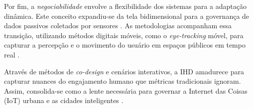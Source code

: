 \documentclass[
	12pt,				%
	oneside,			%
	a4paper,			%
	english,			%
	brazil				%
	]{abntex2ppgsi}
\begin{document}
    Por fim, a \emph{negociabilidade} envolve a flexibilidade dos sistemas para a adaptação dinâmica. Este conceito expandiu-se da tela bidimensional para a governança de dados passivos coletados por sensores \cite{Sailaja2024334, Lenzi2024, Mashhadi2014}. As metodologias acompanham essa transição, utilizando métodos digitais móveis, como o \textit{eye-tracking} móvel, para capturar a percepção e o movimento do usuário em espaços públicos em tempo real \cite{kaufmann2021ethical}.
    
    Através de métodos de \textit{co-design} e cenários interativos, a IHD amadurece para capturar nuances do engajamento humano que métricas tradicionais ignoram. Assim, consolida-se como a lente necessária para governar a Internet das Coisas (IoT) urbana e as cidades inteligentes \cite{sailaja2021exploring, DOWTHWAITE2024, DeBettio2023, Calvetti2021173, Chowdhury2016}.
\end{document}
